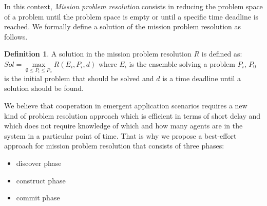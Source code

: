 \documentclass[journal]{IEEEtran}
\theoremstyle{definition}
\newtheorem{definition}{Definition}
\begin{document}

In this context, \textit{Mission problem resolution} consists in reducing the problem space of a problem until the problem space is empty or until a specific time deadline is reached. We formally define a solution of the mission problem resolution as follows.

\begin{definition}
A solution in the mission problem resolution $R$ is defined as:
$Sol=\max \limits_{ \emptyset \leq P_i \leq P_o} R(E_i, P_i, d)$
where $E_i$ is the ensemble solving a problem $P_i$, $P_0$ is the initial problem that should be solved and $d$ is a time deadline until a solution should be found.





\end{definition}


We believe that cooperation in emergent application scenarios requires a new kind of problem resolution approach which is efficient in terms of short delay and which does not require knowledge of which and how many agents are in the system in a particular point of time. 
That is why we propose a best-effort approach for mission problem resolution that consists of three phases:
\begin{itemize}
\item discover phase 
\item construct phase
\item commit phase
\end{itemize}
 
\end{document}
